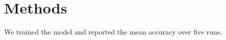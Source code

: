 \documentclass{article}
\begin{document}
\section{Methods}
We trained the model and reported the mean accuracy over five runs.
\end{document}
